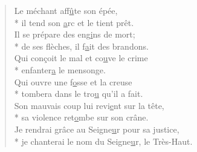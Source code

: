 \begin{verse}
Le méchant aff\underline{û}te son épée, \\*
il tend son \underline{a}rc et le tient prêt. \\
Il se prépare des eng\underline{i}ns de mort; \\*
de ses flèches, il f\underline{a}it des brandons. \\

Qui conçoit le mal et co\underline{u}ve le crime \\*
enfanter\underline{a} le mensonge. \\
Qui ouvre une f\underline{o}sse et la creuse \\*
tombera dans le tro\underline{u} qu’il a fait. \\
Son mauvais coup lui revi\underline{e}nt sur la tête, \\*
sa violence ret\underline{o}mbe sur son crâne. \\

Je rendrai grâce au Seigne\underline{u}r pour sa justice, \\*
je chanterai le nom du Seigne\underline{u}r, le Très-Haut. \\
\end{verse}

